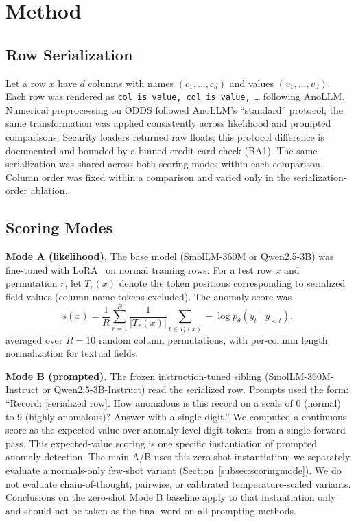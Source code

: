 \documentclass[conference]{IEEEtran}
\begin{document}
\section{Method}\label{sec:method}

\subsection{Row Serialization}
Let a row $x$ have $d$ columns with names $(c_1,\ldots,c_d)$ and values $(v_1,\ldots,v_d)$.
Each row was rendered as \texttt{col is value, col is value, \ldots} following AnoLLM.
Numerical preprocessing on ODDS followed AnoLLM's ``standard'' protocol; the same transformation was applied consistently across likelihood and prompted comparisons.
Security loaders returned raw floats; this protocol difference is documented and bounded by a binned credit-card check (BA1).
The same serialization was shared across both scoring modes within each comparison.
Column order was fixed within a comparison and varied only in the serialization-order ablation.

\subsection{Scoring Modes}
\textbf{Mode A (likelihood).}
The base model (SmolLM-360M or Qwen2.5-3B) was fine-tuned with LoRA~\cite{hu2022lora} on normal training rows.
For a test row $x$ and permutation $r$, let $T_r(x)$ denote the token positions corresponding to serialized field values (column-name tokens excluded).
The anomaly score was
\begin{equation}
s(x)=\frac{1}{R}\sum_{r=1}^{R}\frac{1}{|T_r(x)|}\sum_{t\in T_r(x)}-\log p_\theta(y_t \mid y_{<t}),
\end{equation}
averaged over $R=10$ random column permutations, with per-column length normalization for textual fields.

\textbf{Mode B (prompted).}
The frozen instruction-tuned sibling (SmolLM-360M-Instruct or Qwen2.5-3B-Instruct) read the serialized row.
Prompts used the form: ``Record: [serialized row]. How anomalous is this record on a scale of 0 (normal) to 9 (highly anomalous)? Answer with a single digit.''
We computed a continuous score as the expected value over anomaly-level digit tokens from a single forward pass.
This expected-value scoring is one specific instantiation of prompted anomaly detection.
The main A/B uses this zero-shot instantiation; we separately evaluate a normals-only few-shot variant (Section~\ref{subsec:scoringmode}). We do not evaluate chain-of-thought, pairwise, or calibrated temperature-scaled variants. Conclusions on the zero-shot Mode B baseline apply to that instantiation only and should not be taken as the final word on all prompting methods.
\end{document}
